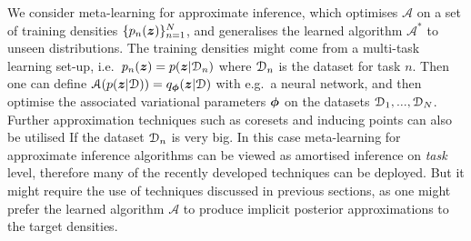 We consider meta-learning for approximate inference, which optimises $\mathcal{A}$ on a set of training densities $\{ p_n(\bm{z}) \}_{n=1}^N$, and generalises the learned algorithm $\mathcal{A}^*$ to unseen distributions. The training densities might come from a multi-task learning set-up, i.e.~$p_n(\bm{z}) = p(\bm{z} | \mathcal{D}_n)$ where $\mathcal{D}_n$ is the dataset for task $n$. Then one can define $\mathcal{A}(p(\bm{z} | \mathcal{D})) = q_{\bm{\phi}}(\bm{z} | \mathcal{D})$ with e.g.~a neural network, and then optimise the associated variational parameters $\bm{\phi}$ on the datasets $\mathcal{D}_1, ..., \mathcal{D}_N$. Further approximation techniques such as coresets \citep{huggins:coresets2016} and inducing points \citep{snelson:sparse_gp2006} can also be utilised If the dataset $\mathcal{D}_n$ is very big. In this case meta-learning for approximate inference algorithms can be viewed as amortised inference on \emph{task} level, therefore many of the recently developed techniques can be deployed. But it might require the use of techniques discussed in previous sections, as one might prefer the learned algorithm $\mathcal{A}$ to produce implicit posterior approximations to the target densities.

